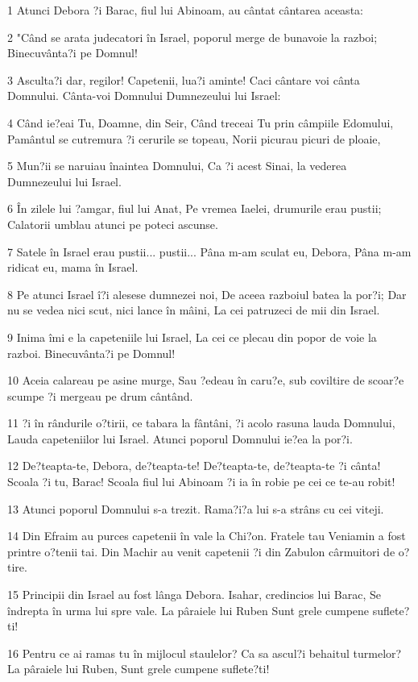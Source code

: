 \par 1 Atunci Debora ?i Barac, fiul lui Abinoam, au cântat cântarea aceasta:
\par 2 "Când se arata judecatori în Israel, poporul merge de bunavoie la razboi; Binecuvânta?i pe Domnul!
\par 3 Asculta?i dar, regilor! Capetenii, lua?i aminte! Caci cântare voi cânta Domnului. Cânta-voi Domnului Dumnezeului lui Israel:
\par 4 Când ie?eai Tu, Doamne, din Seir, Când treceai Tu prin câmpiile Edomului, Pamântul se cutremura ?i cerurile se topeau, Norii picurau picuri de ploaie,
\par 5 Mun?ii se naruiau înaintea Domnului, Ca ?i acest Sinai, la vederea Dumnezeului lui Israel.
\par 6 În zilele lui ?amgar, fiul lui Anat, Pe vremea Iaelei, drumurile erau pustii; Calatorii umblau atunci pe poteci ascunse.
\par 7 Satele în Israel erau pustii... pustii... Pâna m-am sculat eu, Debora, Pâna m-am ridicat eu, mama în Israel.
\par 8 Pe atunci Israel î?i alesese dumnezei noi, De aceea razboiul batea la por?i; Dar nu se vedea nici scut, nici lance în mâini, La cei patruzeci de mii din Israel.
\par 9 Inima îmi e la capeteniile lui Israel, La cei ce plecau din popor de voie la razboi. Binecuvânta?i pe Domnul!
\par 10 Aceia calareau pe asine murge, Sau ?edeau în caru?e, sub coviltire de scoar?e scumpe ?i mergeau pe drum cântând.
\par 11 ?i în rândurile o?tirii, ce tabara la fântâni, ?i acolo rasuna lauda Domnului, Lauda capeteniilor lui Israel. Atunci poporul Domnului ie?ea la por?i.
\par 12 De?teapta-te, Debora, de?teapta-te! De?teapta-te, de?teapta-te ?i cânta! Scoala ?i tu, Barac! Scoala fiul lui Abinoam ?i ia în robie pe cei ce te-au robit!
\par 13 Atunci poporul Domnului s-a trezit. Rama?i?a lui s-a strâns cu cei viteji.
\par 14 Din Efraim au purces capetenii în vale la Chi?on. Fratele tau Veniamin a fost printre o?tenii tai. Din Machir au venit capetenii ?i din Zabulon cârmuitori de o?tire.
\par 15 Principii din Israel au fost lânga Debora. Isahar, credincios lui Barac, Se îndrepta în urma lui spre vale. La pâraiele lui Ruben Sunt grele cumpene suflete?ti!
\par 16 Pentru ce ai ramas tu în mijlocul staulelor? Ca sa ascul?i behaitul turmelor? La pâraiele lui Ruben, Sunt grele cumpene suflete?ti!
